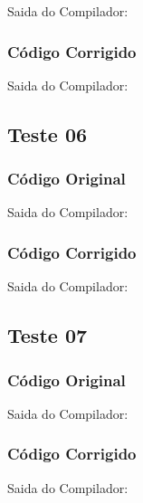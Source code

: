 Saida do Compilador:




\subsubsection{Código Corrigido}


Saida do Compilador:




\subsection{Teste 06}
\label{subsec:lexicoTeste06}

\subsubsection{Código Original}


Saida do Compilador:




\subsubsection{Código Corrigido}


Saida do Compilador:




\subsection{Teste 07}
\label{subsec:lexicoTeste07}

\subsubsection{Código Original}


Saida do Compilador:




\subsubsection{Código Corrigido}


Saida do Compilador:


